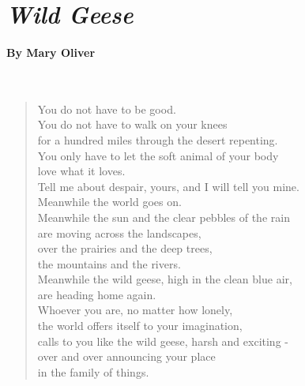 \documentclass[12pt, openany, letterpaper]{memoir}
\begin{document}
\section*{\emph{Wild Geese}}
\paragraph{By Mary Oliver}~
\begin{verse}
	You do not have to be good.\\
	You do not have to walk on your knees\\
	for a hundred miles through the desert repenting.\\
	You only have to let the soft animal of your body\\
	love what it loves.\\
	Tell me about despair, yours, and I will tell you mine.\\
	Meanwhile the world goes on.\\
	Meanwhile the sun and the clear pebbles of the rain\\
	are moving across the landscapes,\\
	over the prairies and the deep trees,\\
	the mountains and the rivers.\\
	Meanwhile the wild geese, high in the clean blue air,\\
	are heading home again.\\
	Whoever you are, no matter how lonely,\\
	the world offers itself to your imagination,\\
	calls to you like the wild geese, harsh and exciting -\\
	over and over announcing your place\\
	in the family of things.
\end{verse}
\end{document}
